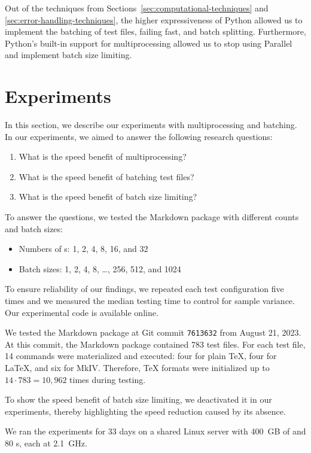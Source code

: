 \documentclass[final]{ltugboat}
\begin{document}
Out of the techniques from Sections~\ref{sec:computational-techniques} and \ref{sec:error-handling-techniques}, the higher expressiveness of Python allowed us to implement the batching of test files, failing fast, and batch splitting. Furthermore, Python's built-in support for multiprocessing allowed us to stop using  Parallel and implement batch size limiting.

\section{Experiments}
\label{sec:experiments}

In this section, we describe our experiments with multiprocessing and batching. In our experiments, we aimed to answer the following research questions:
\begin{enumerate}
\item What is the speed benefit of multiprocessing?
\item What is the speed benefit of batching test files?
\item What is the speed benefit of batch size limiting?
\end{enumerate}
To answer the questions, we tested the Markdown package with different  counts and batch sizes:
\begin{itemize}
\item Numbers of s: 1, 2, 4, 8, 16, and 32
\item Batch sizes: 1, 2, 4, 8, \ldots, 256, 512, and 1024
\end{itemize}
To ensure reliability of our findings, we repeated each test configuration five times and we measured the median testing time to control for sample variance. Our experimental code is available online.~\cite{starynovotny2023measure}

We tested the Markdown package at Git commit \texttt{7613632} from August 21, 2023. At this commit, the Markdown package contained 783 test files. For each test file, 14 commands were materialized and executed: four for plain \TeX, four for \LaTeX, and six for  MkIV. Therefore, \TeX{} formats were initialized up to $14\cdot 783 = 10{,}962$ times during testing.

To show the speed benefit of batch size limiting, we deactivated it in our experiments, thereby highlighting the speed reduction caused by its absence.

We ran the experiments for 33 days on a shared Linux server with 400~GB of  and 80 s, each at 2.1~GHz.
\end{document}
